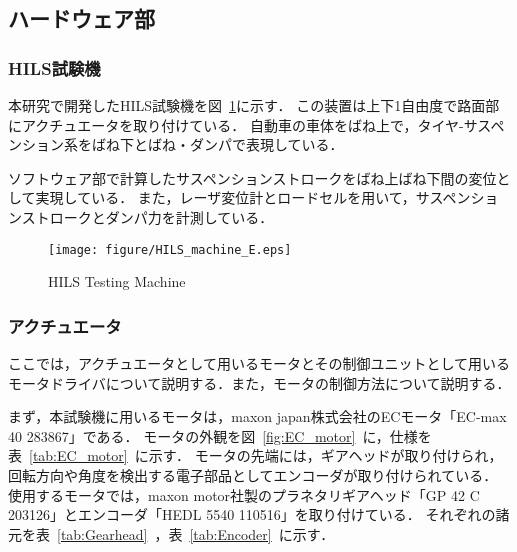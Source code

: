 \documentclass[a4paper,12pt]{article_vdlab_sotsuron}
\begin{document}
\newpage
\subsection{ハードウェア部}
\subsubsection{HILS試験機}
本研究で開発したHILS試験機を図~\ref{HILSmachine}に示す．
この装置は上下1自由度で路面部にアクチュエータを取り付けている．
自動車の車体をばね上で，タイヤ-サスペンション系をばね下とばね・ダンパで表現している．
\par
ソフトウェア部で計算したサスペンションストロークをばね上ばね下間の変位として実現している．
また，レーザ変位計とロードセルを用いて，サスペンションストロークとダンパ力を計測している．

\vspace{24mm}
\begin{figure}[h]
  \begin{center}
  \texttt{[image: figure/HILS\_machine\_E.eps]}
  \vspace{4mm}
   \caption{HILS Testing Machine}
  \label{HILSmachine}
  \end{center}
\end{figure}


\newpage
\subsubsection{アクチュエータ}
ここでは，アクチュエータとして用いるモータとその制御ユニットとして用いるモータドライバについて説明する．また，モータの制御方法について説明する．
\par
まず，本試験機に用いるモータは，maxon japan株式会社のECモータ「EC-max 40 283867」である．
モータの外観を図~\ref{fig:EC_motor}~に，仕様を表~\ref{tab:EC_motor}~に示す．
モータの先端には，ギアヘッドが取り付けられ，回転方向や角度を検出する電子部品としてエンコーダが取り付けられている．
使用するモータでは，maxon motor社製のプラネタリギアヘッド「GP 42 C 203126」とエンコーダ「HEDL 5540 110516」を取り付けている．
それぞれの諸元を表~\ref{tab:Gearhead}~，表~\ref{tab:Encoder}~に示す．
\end{document}
